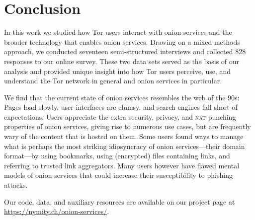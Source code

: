 \section{Conclusion}
\label{sec:conclusion}

In this work we studied how Tor users interact with onion services and the
broader technology that enables onion services.  Drawing on a mixed-methods
approach, we conducted seventeen semi-structured interviews and collected 828
responses to our online survey.  These two data sets served as the basis of our
analysis and provided unique insight into how Tor users perceive, use, and
understand the Tor network in general and onion services in particular.

We find that the current state of onion services resembles the web of the 90s:
Pages load slowly, user interfaces are clumsy, and search engines fall short of
expectations.  Users appreciate the extra security, privacy, and \textsc{nat}
punching properties of onion services, giving rise to numerous use cases, but
are frequently wary of the content that is hosted on them.  Some users found
ways to manage what is perhaps the most striking idiosyncracy of onion
services---their domain format---by using bookmarks, using (encrypted) files
containing links, and referring to trusted link aggregators.  Many users however
have flawed mental models of onion services that could increase their
susceptibility to phishing attacks.

Our code, data, and auxiliary resources are available on our project page at
\url{https://nymity.ch/onion-services/}.
